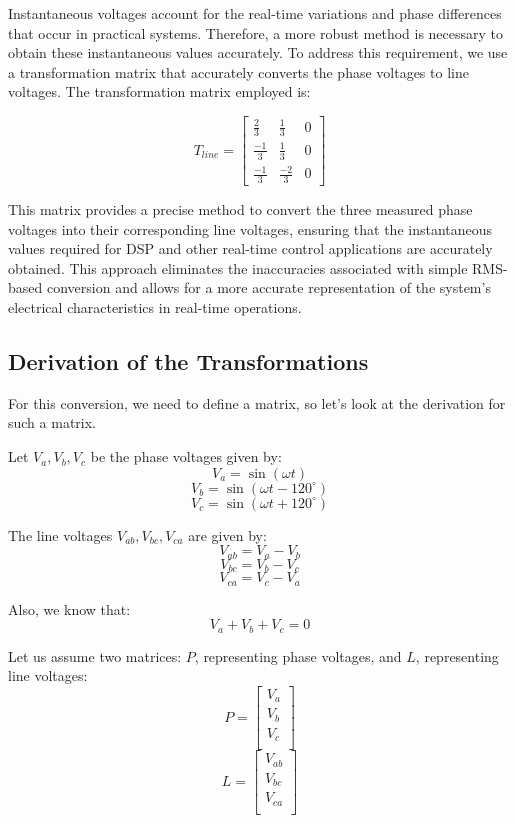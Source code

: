 Instantaneous voltages account for the real-time variations and phase
differences that occur in practical systems. Therefore, a more robust method is
necessary to obtain these instantaneous values accurately. To address this
requirement, we use a transformation matrix that accurately converts the phase
voltages to line voltages. The transformation matrix employed is:

\begin{equation*}
    T_{line} =
    \begin{bmatrix}
        \frac{2}{3}  & \frac{1}{3}  & 0 \\
        \frac{-1}{3} & \frac{1}{3}  & 0 \\
        \frac{-1}{3} & \frac{-2}{3} & 0
    \end{bmatrix}
\end{equation*}

This matrix provides a precise method to convert the three measured phase
voltages into their corresponding line voltages, ensuring that the
instantaneous values required for DSP and other real-time control applications
are accurately obtained. This approach eliminates the inaccuracies associated
with simple RMS-based conversion and allows for a more accurate representation
of the system's electrical characteristics in real-time operations.

\subsection{Derivation of the Transformations}
For this conversion, we need to define a matrix, so let's look at the
derivation for such a matrix.

Let \( V_a, V_b, V_c \) be the phase voltages given by:
\[
    V_a = \sin(\omega t)
\]
\[
    V_b = \sin(\omega t - 120^\circ)
\]
\[
    V_c = \sin(\omega t + 120^\circ)
\]

The line voltages \( V_{ab}, V_{bc}, V_{ca} \) are given by:
\[
    V_{ab} = V_a - V_b
\]
\[
    V_{bc} = V_b - V_c
\]
\[
    V_{ca} = V_c - V_a
\]

Also, we know that:
\[
    V_a + V_b + V_c = 0
\]

Let us assume two matrices: \( P \), representing phase voltages, and \( L \),
representing line voltages:
\[
    P = \begin{bmatrix}
        V_a \\
        V_b \\
        V_c \\
    \end{bmatrix}
\]
\[
    L = \begin{bmatrix}
        V_{ab} \\
        V_{bc} \\
        V_{ca} \\
    \end{bmatrix}
\]

